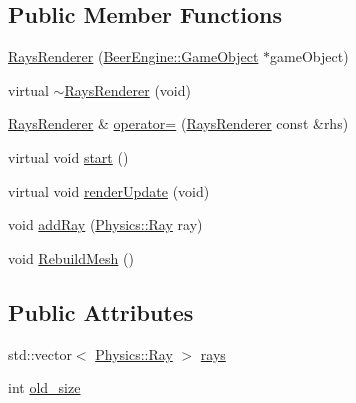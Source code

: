 \subsection*{Public Member Functions}
\begin{DoxyCompactItemize}
\item 
\mbox{\hyperlink{class_beer_engine_1_1_component_1_1_rays_renderer_a0d3637f17a8c0c6e159a52a196834bb6}{Rays\+Renderer}} (\mbox{\hyperlink{class_beer_engine_1_1_game_object}{Beer\+Engine\+::\+Game\+Object}} $\ast$game\+Object)
\item 
virtual \mbox{\hyperlink{class_beer_engine_1_1_component_1_1_rays_renderer_a23d7ca257ec101eef546b51b0d6a6e36}{$\sim$\+Rays\+Renderer}} (void)
\item 
\mbox{\hyperlink{class_beer_engine_1_1_component_1_1_rays_renderer}{Rays\+Renderer}} \& \mbox{\hyperlink{class_beer_engine_1_1_component_1_1_rays_renderer_af7fb2a4d060a59e907580d8689cf4256}{operator=}} (\mbox{\hyperlink{class_beer_engine_1_1_component_1_1_rays_renderer}{Rays\+Renderer}} const \&rhs)
\item 
virtual void \mbox{\hyperlink{class_beer_engine_1_1_component_1_1_rays_renderer_a309d7940148feada1c9497e2444a6548}{start}} ()
\item 
virtual void \mbox{\hyperlink{class_beer_engine_1_1_component_1_1_rays_renderer_a1647c9a5f40fc9186ccb6d55b7ebfe5e}{render\+Update}} (void)
\item 
void \mbox{\hyperlink{class_beer_engine_1_1_component_1_1_rays_renderer_a0597197520e656dde062527344d050e0}{add\+Ray}} (\mbox{\hyperlink{struct_beer_engine_1_1_physics_1_1_ray}{Physics\+::\+Ray}} ray)
\item 
void \mbox{\hyperlink{class_beer_engine_1_1_component_1_1_rays_renderer_ab452c92a57a002fced157ec9913d40c8}{Rebuild\+Mesh}} ()
\end{DoxyCompactItemize}
\subsection*{Public Attributes}
\begin{DoxyCompactItemize}
\item 
std\+::vector$<$ \mbox{\hyperlink{struct_beer_engine_1_1_physics_1_1_ray}{Physics\+::\+Ray}} $>$ \mbox{\hyperlink{class_beer_engine_1_1_component_1_1_rays_renderer_a3f80ea11d34b53d1ddddeb0a91f96e30}{rays}}
\item 
int \mbox{\hyperlink{class_beer_engine_1_1_component_1_1_rays_renderer_a3ae64b7d39b2a52add74450a65343d31}{old\+\_\+size}}
\end{DoxyCompactItemize}
